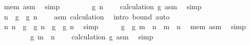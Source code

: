 \begin{isabellebody}
\ {\isasymphi}{\isacharunderscore}{\kern0pt}mem\ asm\ \isamarkupfalse%
\ simp\isanewline
\ \ \ \ \isamarkupfalse%
\ \isamarkupfalse%
\ {\isachardoublequoteopen}{\isacharquery}{\kern0pt}{\isasymphi}\ g\ n\ {\isachargreater}{\kern0pt}\ {}{\isachardoublequoteclose}\ \isamarkupfalse%
\ calculation\ g\ asm\ \isamarkupfalse%
\ simp\isanewline
\ \ \ \ \isamarkupfalse%
\ \isamarkupfalse%
\ {\isachardoublequoteopen}n\ {\isachargreater}{\kern0pt}\ g\ {\isacharparenleft}{\kern0pt}{\isacharquery}{\kern0pt}{\isasymphi}\ g\ n\ {\isacharminus}{\kern0pt}\ {}{\isacharparenright}{\kern0pt}{\isachardoublequoteclose}\ \isamarkupfalse%
\ asm\ calculation\ \isamarkupfalse%
\ {\isacharparenleft}{\kern0pt}intro\ {\isasymphi}{\isacharunderscore}{\kern0pt}bound{\isacharprime}{\kern0pt}{\isacharparenright}{\kern0pt}\ auto\isanewline
\ \ \ \ \isamarkupfalse%
\ \isamarkupfalse%
\ n{\isacharcolon}{\kern0pt}\ {\isachardoublequoteopen}n\ {\isasymin}\ {\isacharbraceleft}{\kern0pt}g\ {\isacharparenleft}{\kern0pt}{\isacharquery}{\kern0pt}{\isasymphi}\ g\ n\ {\isacharminus}{\kern0pt}\ {}{\isacharparenright}{\kern0pt}{\isacharless}{\kern0pt}{\isachardot}{\kern0pt}{\isachardot}{\kern0pt}g\ {\isacharparenleft}{\kern0pt}{\isacharquery}{\kern0pt}{\isasymphi}\ g\ n{\isacharparenright}{\kern0pt}{\isacharbraceright}{\kern0pt}{\isachardoublequoteclose}\ \isamarkupfalse%
\ simp\isanewline
\isanewline
\ \ \ \ \isamarkupfalse%
\ {\isachardoublequoteopen}g\ {\isacharparenleft}{\kern0pt}{\isacharquery}{\kern0pt}{\isasymphi}\ g\ {\isacharparenleft}{\kern0pt}m\ {\isacharplus}{\kern0pt}\ n{\isacharparenright}{\kern0pt}{\isacharparenright}{\kern0pt}\ {\isasymge}\ m\ {\isacharplus}{\kern0pt}\ n{\isachardoublequoteclose}\ \isamarkupfalse%
\ {\isasymphi}{\isacharunderscore}{\kern0pt}mem\ asm\ \isamarkupfalse%
\ simp\isanewline
\ \ \ \ \isamarkupfalse%
\ \isamarkupfalse%
\ {\isachardoublequoteopen}{\isacharquery}{\kern0pt}{\isasymphi}\ g\ {\isacharparenleft}{\kern0pt}m\ {\isacharplus}{\kern0pt}\ n{\isacharparenright}{\kern0pt}\ {\isachargreater}{\kern0pt}\ {}{\isachardoublequoteclose}\ \isamarkupfalse%
\ calculation\ g\ asm\ \isamarkupfalse%
\ simp\isanewline
\ \ \ \ \isamarkupfalse%
\ \isamarkupfalse%

\end{isabellebody}
